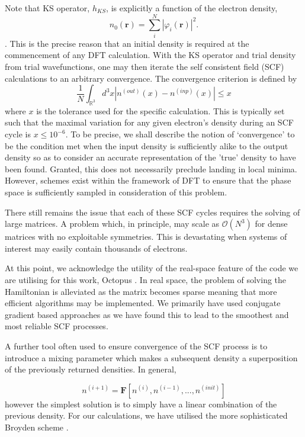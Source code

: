 Note that KS operator, $h_{KS}$, is explicitly a function of the electron density,
\begin{equation}
    n_{0}(\textbf{r}) = \sum_{i}^{N} |\varphi_{i}(\textbf{r})|^{2}.
    \label{eqn:dens}
\end{equation}. 
This is the precise reason that an initial density is required at the commencement of any DFT calculation. With the KS operator and trial density from trial wavefunctions, one may then iterate the self consistent field (SCF) calculations to an arbitrary convergence. The convergence criterion is defined by
\begin{equation}
    \frac{1}{N}  \int_{\mathbb{R}^{3}} d^{3}x \left| n^{(out)}(x) - n^{(inp)}(x)  \right|   \leq x
    \label{eqn:conv}
\end{equation}
where $x$ is the tolerance used for the specific calculation. This is typically set such that the maximal variation for any given electron's density during an SCF cycle is $x\leq10^{-6}$. To be precise, we shall describe the notion of `convergence' to be the condition met when the input density is sufficiently alike to the output density so as to consider an accurate representation of the 'true' density to have been found. Granted, this does not necessarily preclude landing in local minima. However, schemes exist within the framework of DFT to ensure that the phase space is sufficiently sampled in consideration of this problem.

There still remains the issue that each of these SCF cycles requires the solving of large matrices. A problem which, in principle, may scale as $\mathcal{O}(N^{3})$ for dense matrices with no exploitable symmetries. This is devastating when systems of interest may easily contain thousands of electrons. 

At this point, we acknowledge the utility of the real-space feature of the code we are utilising for this work, Octopus \cite{Octopus2003,Octopus_2006}. In real space, the problem of solving the Hamiltonian is alleviated as the matrix becomes sparse meaning that more efficient algorithms may be implemented. We primarily have used conjugate gradient based approaches as we have found this to lead to the smoothest and most reliable SCF processes.

A further tool often used to ensure convergence of the SCF process is to introduce a mixing parameter which makes a subsequent density a superposition of the previously returned densities. In general,

\begin{equation}
    n^{(i+1)} = \mathbf{F}\left[n^{(i)}, n^{(i-1)}, ..., n^{(init)} \right]
\end{equation}
however the simplest solution is to simply have a linear combination of the previous density. For our calculations, we have utilised the more sophisticated Broyden scheme \cite{Oct_2020}.

